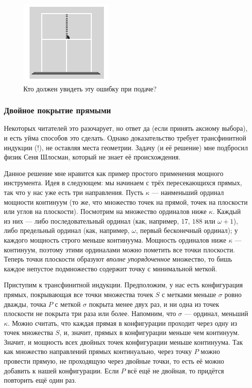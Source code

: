 \begin{figure}[ht!]
\centering
\includegraphics[scale=1]{pics/tenis}
\caption{Кто должен увидеть эту ошибку при подаче?}
\label{pic:tenis}
\end{figure}


\subsubsection*{Двойное покрытие прямыми}


Некоторых читателей это разочарует, но ответ да (если принять аксиому выбора), и есть уйма способов это сделать. 
Однако доказательство требует трансфинитной индукции (!), не оставляя места геометрии.
Задачу (и её решение) мне подбросил физик Сеня Шлосман, который не знает её происхождения.

Данное решение мне нравится как пример простого применения мощного инструмента.
Идея в следующем: мы начинаем с трёх пересекающихся прямых, так что у нас уже есть три направления.
Пусть $\kappa$ --- наименьший ординал мощности континуум (то же, что множество точек на прямой, точек на плоскости или углов на плоскости).
Посмотрим на множество ординалов ниже $\kappa$.
Каждый из них --- либо последовательный ординал (как, например, $17$, $188$ или $\omega + 1$), либо предельный ординал (как, например, $\omega$, первый бесконечный ординал); у каждого мощность строго меньше континуума.
Мощность ординалов ниже $\kappa$ --- континуум, поэтому этими ординалами можно пометить все точки плоскости.
Теперь точки плоскости образуют \emph{вполне упорядоченное} множество, то бишь каждое непустое подмножество содержит точку с минимальной меткой.

Приступим к трансфинитной индукции.
Предположим, у нас есть конфигурация прямых, покрывающая все точки множества точек $S$ с метками меньше $\sigma$ ровно дважды,
точка $P$ с меткой $\sigma$ покрыта менее двух раз,
и ни одна из точек плоскости не покрыта три раза или более.
Напомним, что $\sigma$ --- ординал, меньший $\kappa$.
Можно считать, что каждая прямая в конфигурации проходит через одну из точек множества $S$, и, значит, прямых в конфигурации меньше чем континуум.
Значит, и мощность всех двойных точек конфигурации меньше континуума.
Так как множество направлений прямых континуально, через точку $P$ можно провести прямую, не проходящую через двойные точки,
то есть её можно добавить к нашей конфигурации.
Если $P$ всё ещё не двойная, то придётся повторить ещё один раз.

